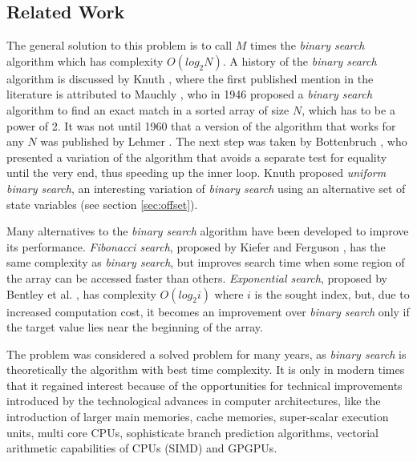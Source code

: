 \documentclass[preprint,1p,times]{elsarticle}
\begin{document}
\subsection{Related Work}
\label{sec:relatedwork}
 The general solution to this problem is to call $M$ times the \textit{binary search} algorithm which has complexity $O\left(log_2N\right)$. A history of the \textit{binary search} algorithm is discussed by Knuth \cite{Knuth1997}, where the first published mention in the literature is attributed to Mauchly \cite{Mauchly1946}, who in 1946 proposed a \textit{binary search} algorithm to find an exact match in a sorted array of size $N$, which has to be a power of 2. It was not until 1960 that a version of the algorithm that works for any $N$ was published by Lehmer \cite{Lehmer1960}. The next step was taken by Bottenbruch \cite{Bottenbruch1962}, who presented a variation of the algorithm that avoids a separate test for equality until the very end, thus speeding up the inner loop. Knuth \cite{Knuth1997} proposed \textit{uniform binary search}, an interesting variation of \textit{binary search} using an alternative set of state variables (see section \ref{sec:offset}).
 
Many alternatives to the \textit{binary search} algorithm have been developed to improve its performance. \textit{Fibonacci search}, proposed by Kiefer \cite{Kiefer1953} and Ferguson \cite{Ferguson1960}, has the same complexity as \textit{binary search}, but improves search time when some region of the array can be accessed faster than others. \textit{Exponential search}, proposed by Bentley et al. \cite{Bentley1976}, has complexity $O\left(log_2i\right)$ where $i$ is the sought index, but, due to increased computation cost, it becomes an improvement over \textit{binary search} only if the target value lies near the beginning of the array. 

The problem was considered a solved problem for many years, as \textit{binary search} is theoretically the algorithm with best time complexity. It is only in modern times that it regained interest because of the opportunities for technical improvements introduced by the technological advances in computer architectures, like the introduction of larger main memories, cache memories, super-scalar execution units, multi core CPUs, sophisticate branch prediction algorithms, vectorial arithmetic capabilities of CPUs (SIMD) and GPGPUs.
\end{document}
